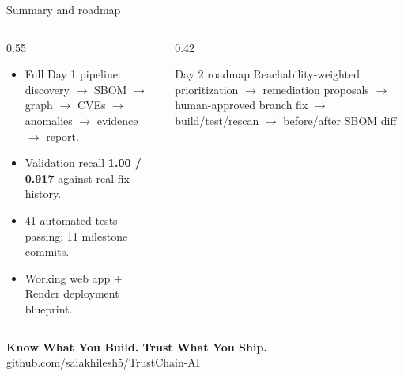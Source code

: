 \documentclass[11pt,aspectratio=169]{beamer}
\begin{document}
\begin{frame}{Summary and roadmap}
\begin{columns}[T]
\begin{column}{0.55\textwidth}
\begin{itemize}\setlength\itemsep{2.5mm}
  \item Full Day 1 pipeline: discovery $\rightarrow$ SBOM $\rightarrow$ graph $\rightarrow$ CVEs $\rightarrow$ anomalies $\rightarrow$ evidence $\rightarrow$ report.
  \item Validation recall \textbf{1.00 / 0.917} against real fix history.
  \item 41 automated tests passing; 11 milestone commits.
  \item Working web app + Render deployment blueprint.
\end{itemize}
\end{column}
\begin{column}{0.42\textwidth}
\begin{block}{Day 2 roadmap}
\small Reachability-weighted prioritization $\rightarrow$ remediation proposals $\rightarrow$ human-approved branch fix $\rightarrow$ build/test/rescan $\rightarrow$ before/after SBOM diff
\end{block}
\end{column}
\end{columns}
\vfill
\begin{center}
{\large\bfseries Know What You Build. Trust What You Ship.}\\[1mm]
{\small\color{guardian}github.com/saiakhilesh5/TrustChain-AI}
\end{center}
\end{frame}
\end{document}
